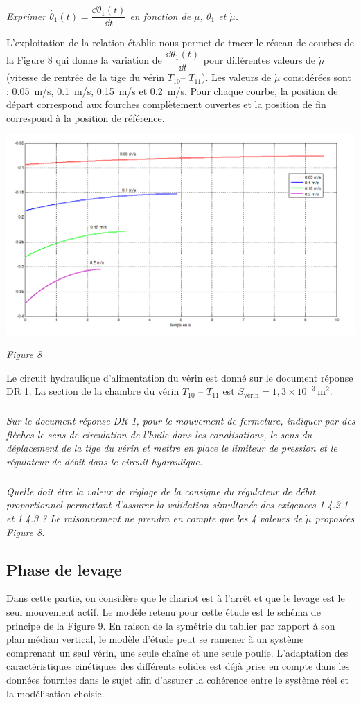 \documentclass[10pt,fleqn]{article} %
\begin{document}
\subparagraph{}
\textit{Exprimer $\dot{\theta_1}(t) = \dfrac{\dd \theta_1(t)}{\dd t}$  en fonction de $\mu$, ${\theta_1}$ et $\dot{\mu}$.}


L’exploitation de la relation établie nous permet de tracer le réseau de courbes de la Figure 8 qui donne la variation de $ \dfrac{\dd \theta_1(t)}{\dd t}$ pour différentes valeurs de $\dot{\mu}$(vitesse de rentrée de la tige du vérin $T_{10}$-- $T_{11}$). Les valeurs de $\dot{\mu}$ considérées sont : \SI{0,05}{m/s}, \SI{0,1}{m/s}, \SI{0,15}{m/s} et \SI{0,2}{m/s}.
Pour chaque courbe, la position de départ correspond aux fourches complètement ouvertes et la position de fin correspond à la position de référence.


\begin{center}
\includegraphics[width=.65\linewidth]{images/fig_08}

\textit{Figure 8}
\end{center}


Le circuit hydraulique d’alimentation du vérin est donné sur le document réponse DR 1.
La section de la chambre du vérin $T_{10}$ -- $T_{11}$ est $S_{\text{v\'erin}}=1,3\times10^{-3}\,\text{m}^2$.

\subparagraph{}
\textit{Sur le document réponse DR 1, pour le mouvement de fermeture, indiquer par des flèches le sens de circulation de l’huile dans les canalisations, le sens du déplacement de la tige du vérin et mettre en place le limiteur de pression et le régulateur de débit dans le circuit hydraulique.}


\subparagraph{}
\textit{Quelle doit être la valeur de réglage de la consigne du régulateur de débit proportionnel permettant d’assurer la validation simultanée des exigences 1.4.2.1 et 1.4.3 ? Le raisonnement ne prendra en compte que les 4 valeurs de $\dot{\mu}$ proposées Figure 8.}


\subsection{Phase de levage}
Dans cette partie, on considère que le chariot est à l’arrêt et que le levage est le seul mouvement actif. Le modèle retenu pour cette étude est le schéma de principe de la Figure 9. En raison de la symétrie du tablier par rapport à son plan médian vertical, le modèle d’étude peut se ramener à un système comprenant un seul vérin, une seule chaîne et une seule poulie. L’adaptation des caractéristiques cinétiques des différents solides est déjà prise en compte dans les données fournies dans le sujet afin d’assurer la cohérence entre le système réel et la modélisation choisie.
\end{document}
